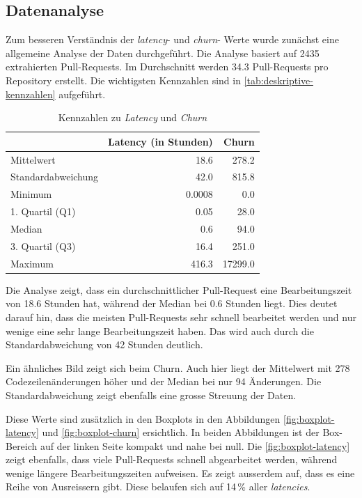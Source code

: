 \subsection{Datenanalyse}
Zum besseren Verständnis der \textit{latency}- und \textit{churn}- Werte wurde zunächst eine allgemeine Analyse der Daten durchgeführt.
Die Analyse basiert auf 2435 extrahierten Pull-Requests. Im Durchschnitt werden 34.3 Pull-Requests pro Repository erstellt. Die wichtigsten Kennzahlen sind in \autoref{tab:deskriptive-kennzahlen} aufgeführt.

\newpage

\begin{table}[htbp]
    \centering
    \caption{Kennzahlen zu \textit{Latency} und \textit{Churn}}
    \begin{tabular}{@{}lrr@{}}
        \toprule
        \textbf & \textbf{Latency (in Stunden)} & \textbf{Churn} \\
         \midrule
        Mittelwert & 18.6 & 278.2 \\
        Standardabweichung &  42.0  & 815.8 \\
        Minimum & 0.0008 & 0.0 \\
        1. Quartil (Q1) & 0.05 & 28.0 \\
        Median & 0.6 & 94.0 \\
        3. Quartil (Q3) &  16.4   & 251.0 \\
        Maximum & 416.3 & 17299.0 \\
        \bottomrule
    \end{tabular}
    \label{tab:deskriptive-kennzahlen}
\end{table}

Die Analyse zeigt, dass ein durchschnittlicher Pull-Request eine Bearbeitungszeit von 18.6 Stunden hat, während der Median bei 0.6 Stunden liegt. Dies deutet darauf hin, dass die meisten Pull-Requests sehr schnell bearbeitet werden und nur wenige eine sehr lange Bearbeitungszeit haben. Das wird auch durch die Standardabweichung von 42 Stunden deutlich.

Ein ähnliches Bild zeigt sich beim Churn. Auch hier liegt der Mittelwert mit 278 Codezeilenänderungen höher und der Median bei nur 94 Änderungen. Die Standardabweichung zeigt ebenfalls eine grosse Streuung der Daten.

Diese Werte sind zusätzlich in den Boxplots in den Abbildungen \autoref{fig:boxplot-latency} und \autoref{fig:boxplot-churn} ersichtlich. 
In beiden Abbildungen ist der Box-Bereich auf der linken Seite kompakt und nahe bei null. 
Die \autoref{fig:boxplot-latency} zeigt ebenfalls, dass viele Pull-Requests schnell abgearbeitet werden, während wenige längere Bearbeitungszeiten aufweisen. Es zeigt ausserdem auf, dass es eine Reihe von Ausreissern gibt. Diese belaufen sich auf 14\,\% aller \textit{latencies}.

